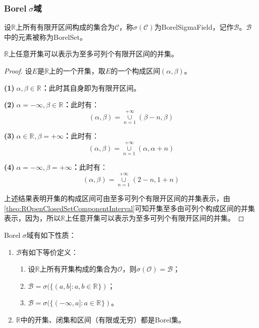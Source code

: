 \subsubsection{Borel$\;\sigma$域}
\begin{definition}
	设$\mathbb{R}$上所有有限开区间构成的集合为$\mathcal{C}$，称$\sigma(\mathcal{C})$为\gls{BorelSigmaField}，记作$\mathcal{B}$。$\mathcal{B}$中的元素被称为\gls{BorelSet}。
\end{definition}
\begin{lemma}\label{lem:OpenSet=CountableFiniteOpenSetUnion}
	$\mathbb{R}$上任意开集可以表示为至多可列个有限开区间的并集。
\end{lemma}
\begin{proof}
	设$E$是$\mathbb{R}$上的一个开集，取$E$的一个构成区间$(\alpha,\beta)$。\par
	\textbf{(1)$\;\alpha,\beta\in\mathbb{R}^{}$：}此时其自身即为有限开区间。\par
	\textbf{(2)$\;\alpha=-\infty,\beta\in\mathbb{R}^{}$：}此时有：
	\begin{equation*}
		(\alpha,\beta)=\underset{n=1}{\overset{+\infty}{\cup}}(\beta-n,\beta)
	\end{equation*}\par
	\textbf{(3)$\;\alpha\in\mathbb{R}^{},\beta=+\infty$：}此时有：
	\begin{equation*}
		(\alpha,\beta)=\underset{n=1}{\overset{+\infty}{\cup}}(\alpha,\alpha+n)
	\end{equation*}\par
	\textbf{(4)$\;\alpha=-\infty,\beta=+\infty$：}此时有：
	\begin{equation*}
		(\alpha,\beta)=\underset{n=1}{\overset{+\infty}{\cup}}(2-n,1+n)
	\end{equation*}\par
	上述结果表明开集的构成区间可由至多可列个有限开区间的并集表示，由\cref{theo:ROpenClosedSetComponentInterval}可知开集至多由可列个构成区间的并集表示，因为，所以$\mathbb{R}$上任意开集可以表示为至多可列个有限开区间的并集。
\end{proof}
\begin{property}\label{prop:BorelSigmaField}
	Borel$\;\sigma$域有如下性质：	
	\begin{enumerate}
		\item $\mathcal{B}$有如下等价定义：
		\begin{enumerate}
			\item 设$\mathbb{R}$上所有开集构成的集合为$\mathcal{O}$，则$\sigma(\mathcal{O})=\mathcal{B}$；
			\item $\mathcal{B}=\sigma(\{(a,b]:a,b\in\mathbb{R}^{}\})$；
			\item $\mathcal{B}=\sigma(\{(-\infty,a]:a\in\mathbb{R}^{}\})$。
		\end{enumerate}
		\item $\mathbb{R}$中的开集、闭集和区间（有限或无穷）都是Borel集。
	\end{enumerate}
\end{property}
